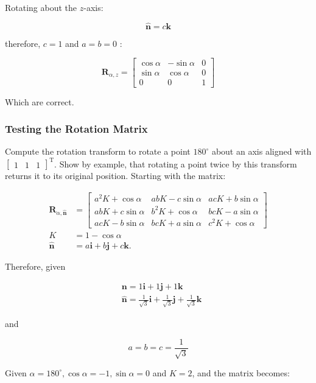 \documentclass[10pt]{article}
\begin{document}
Rotating about the $z$-axis:

$$
\hat{\mathbf{n}}=c \mathbf{k}
$$

therefore, $c=1$ and $a=b=0$ :

$$
\mathbf{R}_{\alpha, z}=\left[\begin{array}{ccc}
\cos \alpha & -\sin \alpha & 0 \\
\sin \alpha & \cos \alpha & 0 \\
0 & 0 & 1
\end{array}\right]
$$

Which are correct.

\subsubsection{Testing the Rotation Matrix}
Compute the rotation transform to rotate a point $180^{\circ}$ about an axis aligned with $\left[\begin{array}{lll}1 & 1 & 1\end{array}\right]^{\mathrm{T}}$. Show by example, that rotating a point twice by this transform returns it to its original position. Starting with the matrix:

$$
\begin{aligned}
\mathbf{R}_{\alpha, \hat{\mathbf{n}}} & =\left[\begin{array}{ccc}
a^{2} K+\cos \alpha & a b K-c \sin \alpha & a c K+b \sin \alpha \\
a b K+c \sin \alpha & b^{2} K+\cos \alpha & b c K-a \sin \alpha \\
a c K-b \sin \alpha & b c K+a \sin \alpha & c^{2} K+\cos \alpha
\end{array}\right] \\
K & =1-\cos \alpha \\
\hat{\mathbf{n}} & =a \mathbf{i}+b \mathbf{j}+c \mathbf{k} .
\end{aligned}
$$

Therefore, given

$$
\begin{aligned}
& \mathbf{n}=1 \mathbf{i}+1 \mathbf{j}+1 \mathbf{k} \\
& \hat{\mathbf{n}}=\frac{1}{\sqrt{3}} \mathbf{i}+\frac{1}{\sqrt{3}} \mathbf{j}+\frac{1}{\sqrt{3}} \mathbf{k}
\end{aligned}
$$

and

$$
a=b=c=\frac{1}{\sqrt{3}}
$$

Given $\alpha=180^{\circ}, \cos \alpha=-1, \sin \alpha=0$ and $K=2$, and the matrix becomes:
\end{document}
